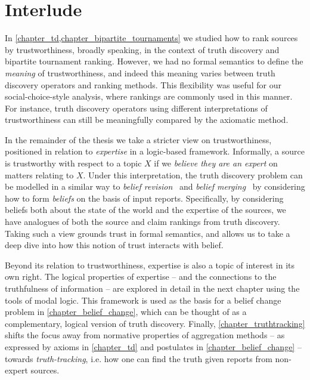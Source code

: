 \chapter*{Interlude}
\label{chapter_interlude}

In \cref{chapter_td,chapter_bipartite_tournaments} we studied how to rank
sources by trustworthiness, broadly speaking, in the context of truth discovery
and bipartite tournament ranking. However, we had no formal semantics to define
the \emph{meaning} of trustworthiness, and indeed this meaning varies between
truth discovery operators and ranking methods. This flexibility was useful for
our social-choice-style analysis, where rankings are commonly used in this
manner. For instance, truth discovery operators using different interpretations
of trustworthiness can still be meaningfully compared by the axiomatic method.

In the remainder of the thesis we take a stricter view on trustworthiness,
positioned in relation to \emph{expertise} in a logic-based framework.
Informally, a source is trustworthy with respect to a topic $X$ if we
\emph{believe they are an expert} on matters relating to $X$. Under this
interpretation, the truth discovery problem can be modelled in a similar way to
\emph{belief revision}~\cite{alchourron1985logic} and \emph{belief
merging}~\cite{konieczny2002merging} by considering how to form \emph{beliefs}
on the basis of input reports. Specifically, by considering beliefs both about
the state of the world and the expertise of the sources, we have analogues of
both the source and claim rankings from truth discovery. Taking such a view
grounds trust in formal semantics, and allows us to take a deep dive into how
this notion of trust interacts with belief.

Beyond its relation to trustworthiness, expertise is also a topic of interest
in its own right. The logical properties of expertise -- and the connections to
the truthfulness of information -- are explored in detail in the next chapter
using the tools of modal logic. This framework is used as the basis for a
belief change problem in \cref{chapter_belief_change}, which can be thought of
as a complementary, logical version of truth discovery. Finally,
\cref{chapter_truthtracking} shifts the focus away from normative properties of
aggregation methods -- as expressed by axioms in \cref{chapter_td} and
postulates in \cref{chapter_belief_change} -- towards \emph{truth-tracking},
i.e. how one can find the truth given reports from non-expert sources.
